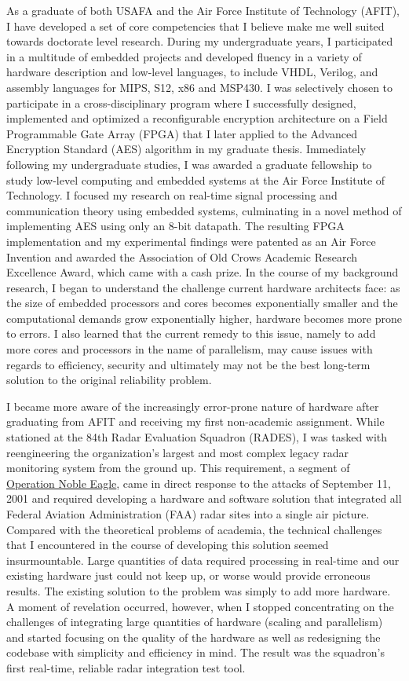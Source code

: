 \documentclass{article}
\begin{document}
As a graduate of both USAFA and the Air Force Institute of Technology
(AFIT), I have developed a set of core competencies that I believe make me well
suited towards doctorate level research. During my undergraduate years, I
participated in a multitude of embedded projects and developed fluency in a
variety of hardware description and low-level languages, to include VHDL,
Verilog, and assembly languages for MIPS, S12, x86 and MSP430. I was
selectively chosen to participate in a cross-disciplinary
program where I successfully designed, implemented and optimized a
reconfigurable encryption architecture on a Field Programmable Gate Array
(FPGA) that I later applied to the Advanced Encryption Standard (AES) algorithm
in my graduate thesis. Immediately following my undergraduate studies, I was
awarded a graduate fellowship to study low-level computing and embedded systems
at the Air Force Institute of Technology. I focused my research on real-time
signal processing and communication theory using embedded systems, culminating
in a novel method of implementing AES using only an 8-bit datapath.  The
resulting FPGA implementation and my experimental findings were patented as an Air Force
Invention and awarded the Association of Old Crows Academic Research Excellence
Award, which came with a cash prize. In the course of my background research, I
began to understand the challenge current hardware architects face: as the size
of embedded processors and cores becomes exponentially smaller and the
computational demands grow exponentially higher, hardware becomes more prone to 
errors. I also learned that the current remedy to this issue, namely to add
more cores and processors in the name of parallelism, may cause issues with
regards to efficiency, security and ultimately may not be the best long-term
solution to the original reliability problem.

I became more aware of the increasingly error-prone nature of hardware after
graduating from AFIT and receiving my first non-academic assignment. While
stationed at the 84th Radar Evaluation Squadron (RADES), I was tasked with
reengineering the organization's largest and most complex legacy radar
monitoring system from the ground up. This requirement, a segment of
\href{http://en.wikipedia.org/wiki/Operation_Noble_Eagle}{Operation Noble
Eagle}, came in direct response to the attacks of September 11, 2001 and
required developing a hardware and software solution that integrated all
Federal Aviation Administration (FAA) radar sites into a single air picture.
Compared with the theoretical problems of academia, the technical challenges that I
encountered in the course of developing this solution seemed insurmountable.
Large quantities of data required processing in real-time and our existing
hardware just could not keep up, or worse would provide erroneous results. The
existing solution to the problem was simply to add more hardware. A moment of
revelation occurred, however, when I
stopped concentrating on the challenges of integrating large quantities of hardware (scaling and parallelism) and
started focusing on the quality of the hardware as well as redesigning the
codebase with simplicity and efficiency in mind. The result was the squadron's
first real-time, reliable radar integration test tool.
\end{document}
